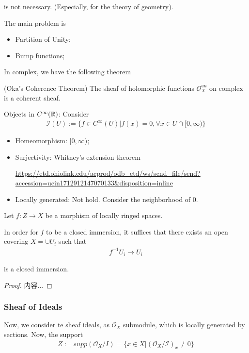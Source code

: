 \documentclass[Total.tex]{subfiles}
\begin{document}
				is not necessary. (Especially, for the theory of geometry). 
				
				The main problem is 
				\begin{itemize}
					\item Partition of Unity;
					\item Bump functions;
				\end{itemize}
				
				In complex, we have the following theorem
				\begin{theorem}
					(Oka's Coherence Theorem) The sheaf of holomorphic functions $\mathcal{O}^{an}_X$ on complex is a coherent sheaf. 
				\end{theorem}
				
				\begin{example}
					Objects in $C^\infty(\mathbb{R})$: Consider
					\begin{gather*}
						\mathcal{I}(U):=\{f\in C^\infty(U)|f(x)=0,\forall x\in U\cap [0,\infty)\}
					\end{gather*}
					
					\begin{itemize}
						\item Homeomorphism: $[0,\infty)$;
						\item Surjectivity: Whitney's extension theorem
						
						\url{https://etd.ohiolink.edu/acprod/odb_etd/ws/send_file/send?accession=ucin1712912147070133&disposition=inline}
						\item Locally generated: Not hold. Consider the neighborhood of $0$.
					\end{itemize}
				\end{example}
				
				\begin{lemma}
					Let $f:Z\rightarrow X$ be a morphism of locally ringed spaces.
					
					In order for $f$ to be a closed immersion, it suffices that there exists an open covering $X=\cup U_i$ such that
					\begin{gather*}
						f^{-1}U_i\rightarrow U_i
					\end{gather*}
					
					is a closed immersion.
				\end{lemma}
				\begin{proof}
					内容...
				\end{proof}
				
				\subsubsection{Sheaf of Ideals}
				Now, we consider te sheaf ideals, as $\mathcal{O}_X$ submodule, which is locally generated by sections.  Now, the support
				\begin{gather*}
					Z:=supp(\mathcal{O}_X/I)=\{x\in X|(\mathcal{O}_X/\mathcal{I})_x\not=0\}
				\end{gather*}
				
\end{document}
